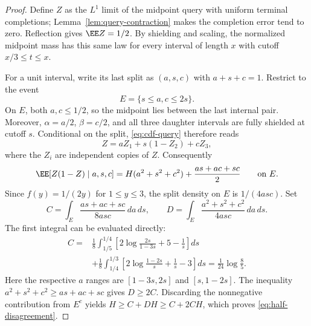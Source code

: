 \documentclass[11pt,letterpaper]{article}
\begin{document}
\begin{proof}
Define $Z$ as the $L^1$ limit of the midpoint query with uniform terminal
completions; Lemma~\ref{lem:query-contraction} makes the completion error
tend to zero. Reflection gives $\EE Z=1/2$. By shielding and scaling,
the normalized midpoint mass has this same law for every interval of
length $x$ with cutoff $x/3\le t\le x$.

For a unit interval, write its last split as $(a,s,c)$ with $a+s+c=1$.
Restrict to the event
\[
 E=\{s\le a,c\le2s\}.
\]
On $E$, both $a,c\le1/2$, so the midpoint lies between the last internal
pair. Moreover, $\alpha=a/2$, $\beta=c/2$, and all three daughter
intervals are fully shielded at cutoff $s$. Conditional on the split,
\eqref{eq:cdf-query} therefore reads
\[
 Z=aZ_1+s(1-Z_2)+cZ_3,
\]
where the $Z_i$ are independent copies of $Z$. Consequently
\[
 \EE[Z(1-Z)\mid a,s,c]
    =H(a^2+s^2+c^2)+\frac{as+ac+sc}{2}\qquad\hbox{on }E.
\]
Since $f(y)=1/(2y)$ for $1\le y\le3$, the split density on $E$ is
$1/(4asc)$. Set
\[
 C=\int_E\frac{as+ac+sc}{8asc}\,da\,ds,
 \qquad D=\int_E\frac{a^2+s^2+c^2}{4asc}\,da\,ds.
\]
The first integral can be evaluated directly:
\begin{align*}
 C={}&\frac18\int_{1/5}^{1/4}
       \left[2\log\frac{2s}{1-3s}+5-\frac1s\right]ds\\
    &+\frac18\int_{1/4}^{1/3}
       \left[2\log\frac{1-2s}{s}+\frac1s-3\right]ds
     =\frac1{24}\log\frac85.
\end{align*}
Here the respective $a$ ranges are $[1-3s,2s]$ and $[s,1-2s]$.
The inequality $a^2+s^2+c^2\ge as+ac+sc$ gives $D\ge2C$.
Discarding the nonnegative contribution from $E^c$ yields
$H\ge C+DH\ge C+2CH$, which proves \eqref{eq:half-disagreement}.


\end{proof}
\end{document}
